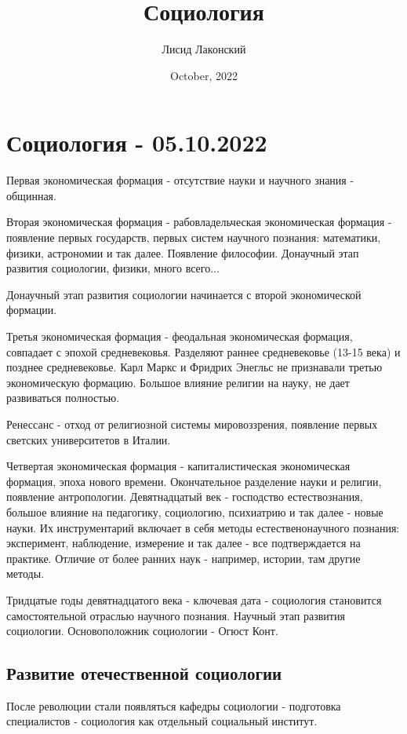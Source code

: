 \documentclass{article}
\title{Социология}
\author{Лисид Лаконский}
\date{October, 2022}
\begin{document}
\maketitle
\tableofcontents
\pagebreak

\section{Социология - 05.10.2022}

Первая экономическая формация - отсутствие науки и научного знания - общинная.

Вторая экономическая формация - рабовладельческая экономическая формация - появление первых государств, первых систем научного познания: математики, физики, астрономии и так далее. Появление философии. Донаучный этап развития социологии, физики, много всего...

Донаучный этап развития социологии начинается с второй экономической формации.

Третья экономическая формация - феодальная экономическая формация, совпадает с эпохой средневековья. Разделяют раннее средневековье (13-15 века) и позднее средневековье. Карл Маркс и Фридрих Энегльс не признавали третью экономическую формацию. Большое влияние религии на науку, не дает развиваться полностью.

Ренессанс - отход от религиозной системы мировоззрения, появление первых светских университетов в Италии.

Четвертая экономическая формация - капиталистическая экономическая формация, эпоха нового времени. Окончательное разделение науки и религии, появление антропологии. Девятнадцатый век - господство естествознания, большое влияние на педагогику, социологию, психиатрию и так далее - новые науки. Их инструментарий включает в себя методы естественонаучного познания: эксперимент, наблюдение, измерение и так далее - все подтверждается на практике. Отличие от более ранних наук - например, истории, там другие методы.

Тридцатые годы девятнадцатого века - ключевая дата - социология становится самостоятельной отраслью научного познания. Научный этап развития социологии. Основоположник социологии - Огюст Конт.

\subsection{Развитие отечественной социологии}

После революции стали появляться кафедры социологии - подготовка специалистов - социология как отдельный социальный институт.
\end{document}
